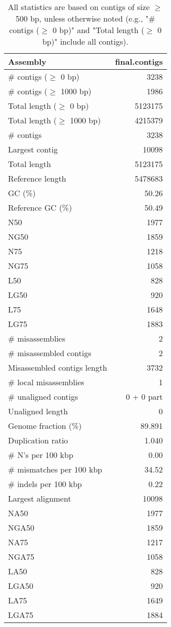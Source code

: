 \documentclass[12pt,a4paper]{article}
\begin{document}
\begin{table}[ht]
\begin{center}
\caption{All statistics are based on contigs of size $\geq$ 500 bp, unless otherwise noted (e.g., "\# contigs ($\geq$ 0 bp)" and "Total length ($\geq$ 0 bp)" include all contigs).}
\begin{tabular}{|l*{1}{|r}|}
\hline
Assembly & final.contigs \\ \hline
\# contigs ($\geq$ 0 bp) & 3238 \\ \hline
\# contigs ($\geq$ 1000 bp) & 1986 \\ \hline
Total length ($\geq$ 0 bp) & 5123175 \\ \hline
Total length ($\geq$ 1000 bp) & 4215379 \\ \hline
\# contigs & 3238 \\ \hline
Largest contig & 10098 \\ \hline
Total length & 5123175 \\ \hline
Reference length & 5478683 \\ \hline
GC (\%) & 50.26 \\ \hline
Reference GC (\%) & 50.49 \\ \hline
N50 & 1977 \\ \hline
NG50 & 1859 \\ \hline
N75 & 1218 \\ \hline
NG75 & 1058 \\ \hline
L50 & 828 \\ \hline
LG50 & 920 \\ \hline
L75 & 1648 \\ \hline
LG75 & 1883 \\ \hline
\# misassemblies & 2 \\ \hline
\# misassembled contigs & 2 \\ \hline
Misassembled contigs length & 3732 \\ \hline
\# local misassemblies & 1 \\ \hline
\# unaligned contigs & 0 + 0 part \\ \hline
Unaligned length & 0 \\ \hline
Genome fraction (\%) & 89.891 \\ \hline
Duplication ratio & 1.040 \\ \hline
\# N's per 100 kbp & 0.00 \\ \hline
\# mismatches per 100 kbp & 34.52 \\ \hline
\# indels per 100 kbp & 0.22 \\ \hline
Largest alignment & 10098 \\ \hline
NA50 & 1977 \\ \hline
NGA50 & 1859 \\ \hline
NA75 & 1217 \\ \hline
NGA75 & 1058 \\ \hline
LA50 & 828 \\ \hline
LGA50 & 920 \\ \hline
LA75 & 1649 \\ \hline
LGA75 & 1884 \\ \hline
\end{tabular}
\end{center}
\end{table}
\end{document}

